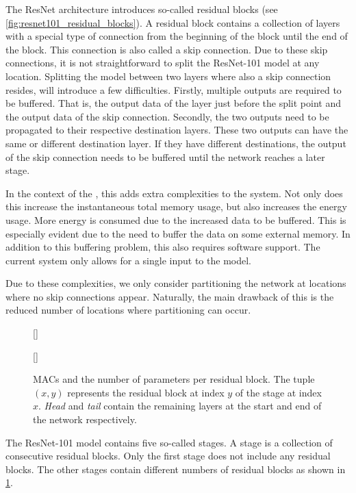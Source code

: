 The ResNet architecture introduces so-called residual blocks (see \cref{fig:resnet101_residual_blocks}).
A residual block contains a collection of layers with a special type of connection from the beginning of the block until the end of the block.
This connection is also called a skip connection.
Due to these skip connections, it is not straightforward to split the ResNet-101 model at any location.
Splitting the model between two layers where also a skip connection resides, will introduce a few difficulties.
Firstly, multiple outputs are required to be buffered.
That is, the output data of the layer just before the split point and the output data of the skip connection.
Secondly, the two outputs need to be propagated to their respective destination layers.
These two outputs can have the same or different destination layer.
If they have different destinations, the output of the skip connection needs to be buffered until the network reaches a later stage.

In the context of the \graicore{}, this adds extra complexities to the system.
Not only does this increase the instantaneous total memory usage, but also increases the energy usage.
More energy is consumed due to the increased data to be buffered.
This is especially evident due to the need to buffer the data on some external memory.
In addition to this buffering problem, this also requires software support.
The current system only allows for a single input to the model. 

Due to these complexities, we only consider partitioning the network at locations where no skip connections appear.
Naturally, the main drawback of this is the reduced number of locations where partitioning can occur.

\begin{figure}[hbtp]
    \centering
    [\textwidth]{
        
    }
    [\textwidth]{
        
    }
    \caption{
        MACs and the number of parameters per residual block.
        The tuple $(x, y)$ represents the residual block at index $y$ of the stage at index $x$.
        \textit{Head} and \textit{tail} contain the remaining layers at the start and end of the network respectively.
    }
    \label{fig:resnet101_stats}
\end{figure}

The ResNet-101 model contains five so-called stages.
A stage is a collection of consecutive residual blocks.
Only the first stage does not include any residual blocks.
The other stages contain different numbers of residual blocks as shown in \cref{fig:resnet101_stats}.

